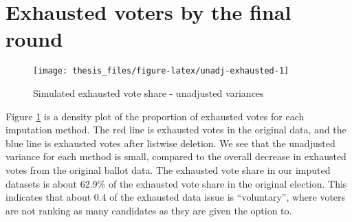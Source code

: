 \documentclass[12pt,twoside]{reedthesis}
\begin{document}
\hypertarget{exhausted-voters-by-the-final-round}{%
\section{Exhausted voters by the final round}\label{exhausted-voters-by-the-final-round}}
\begin{figure}
\texttt{[image: thesis\_files/figure-latex/unadj-exhausted-1]} \caption{Simulated exhausted vote share - unadjusted variances}\label{fig:unadj-exhausted}
\end{figure}
Figure \ref{fig:unadj-exhausted} is a density plot of the proportion of exhausted votes for each imputation method. The red line is exhausted votes in the original data, and the blue line is exhausted votes after listwise deletion. We see that the unadjusted variance for each method is small, compared to the overall decrease in exhausted votes from the original ballot data. The exhausted vote share in our imputed datasets is about 62.9\% of the exhausted vote share in the original election. This indicates that about 0.4 of the exhausted data issue is ``voluntary'', where voters are not ranking as many candidates as they are given the option to.
\end{document}
